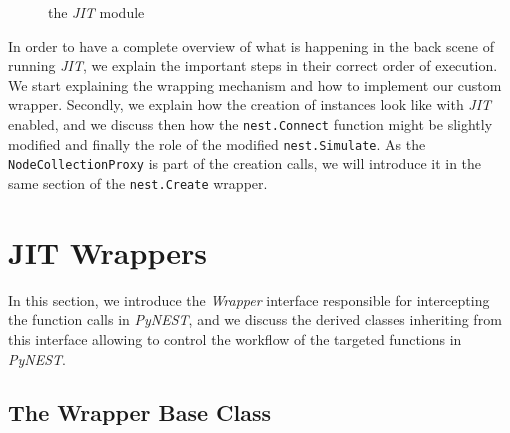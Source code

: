 \begin{figure}[ht!]
{
    }
    \caption{the \emph{JIT} module}
    \label{fig:jit_module}

\end{figure}


In order to have a complete overview of what is happening in the back scene of running \emph{JIT}, we explain the important steps in their correct order of execution. We start explaining the wrapping mechanism and how to implement our custom wrapper. Secondly, we explain how the creation of instances look like with \emph{JIT} enabled, and we discuss then how the \texttt{nest.Connect} function might be slightly modified and finally the role of the modified \texttt{nest.Simulate}. As the \texttt{NodeCollectionProxy} is part of the creation calls, we will introduce it in the same section of  the \texttt{nest.Create} wrapper.





\section{JIT Wrappers}

In this section, we introduce the \emph{Wrapper} interface responsible for intercepting the function calls in \emph{PyNEST}, and we discuss the derived classes inheriting from this interface allowing to control the workflow of the targeted functions in \emph{PyNEST}.

\subsection{The Wrapper Base Class}

